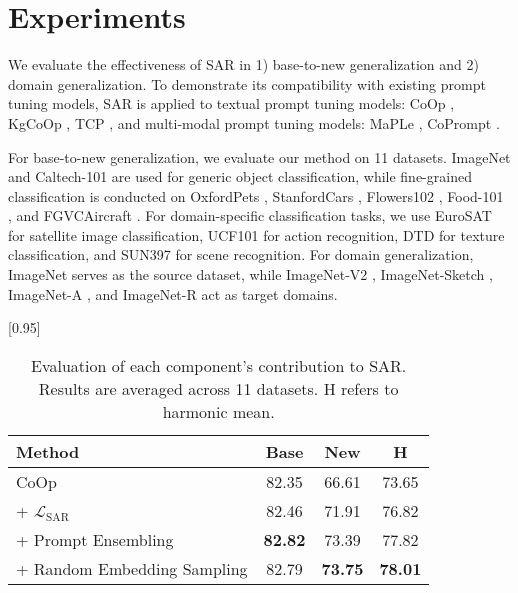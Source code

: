 \section{Experiments}
We evaluate the effectiveness of SAR in 1) base-to-new generalization and 2) domain generalization. To demonstrate its compatibility with existing prompt tuning models, SAR is applied to textual prompt tuning models: CoOp \cite{zhou2022learning}, KgCoOp \cite{yao2023kgcoop}, TCP \cite{yao2024tcp}, and multi-modal prompt tuning models: MaPLe \cite{khattak2023maple}, CoPrompt \cite{roy2024coprompt}.

For base-to-new generalization, we evaluate our method on 11 datasets. ImageNet \cite{deng2009imagenet} and Caltech-101 \cite{fei2004learning} are used for generic object classification, while fine-grained classification is conducted on OxfordPets \cite{parkhi2012cats}, StanfordCars \cite{krause20133d}, Flowers102 \cite{nilsback2008automated}, Food-101 \cite{bossard2014food}, and FGVCAircraft \cite{maji2013fine}. For domain-specific classification tasks, we use EuroSAT \cite{helber2019eurosat} for satellite image classification, UCF101 \cite{soomro2012ucf101} for action recognition, DTD \cite{cimpoi2014describing} for texture classification, and SUN397 \cite{xiao2010sun} for scene recognition. For domain generalization, ImageNet serves as the source dataset, while ImageNet-V2 \cite{recht2019imagenet}, ImageNet-Sketch \cite{wang2019learning}, ImageNet-A \cite{gao2022generating}, and ImageNet-R \cite{hendrycks2021many} act as target domains.

\begin{table}[!t]
    \small \centering
    \renewcommand{\arraystretch}{0.9}
    \setlength{\tabcolsep}{8pt}
    \scalebox{0.95}[0.95]{
        \begin{tabular}{l cc | c }
        \toprule
        Method  & Base & New & H \\
        \midrule
        CoOp & 82.35 & 66.61 & 73.65 \\
        \hspace{0.0em}+ $\mathcal{L}_{\text{SAR}}$ & 82.46 & 71.91 & 76.82 \\
        \hspace{0.0em}+ Prompt Ensembling & \textbf{82.82} & 73.39 & 77.82 \\
        \rowcolor{gray!20}
        \hspace{0.0em}+ Random Embedding Sampling & 82.79 & \textbf{73.75} & \textbf{78.01} \\
        \bottomrule
        \end{tabular}
    }
    \caption{Evaluation of each component's contribution to SAR. Results are averaged across 11 datasets. H refers to harmonic mean.}
    \label{tab:component_ab}
\end{table}

